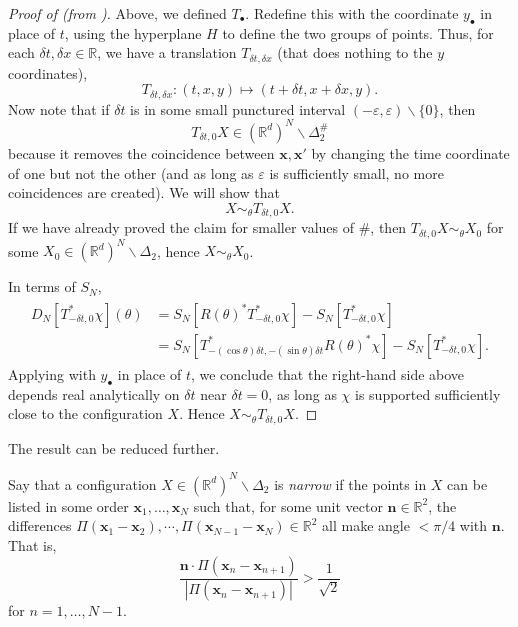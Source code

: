 \documentclass[11pt, letterpaper, reqno]{amsart}
\theoremstyle{definition}
\theoremstyle{remark}
\newcommand{\bbR}{\mathbb{R}}
\newcommand{\bfn}{\mathbf{n}}
\newcommand{\bfx}{\mathbf{x}}
\begin{document}
\begin{proof}[Proof of  (from )]
    
    Above, we defined $T_\bullet$. Redefine this with the coordinate $y_\bullet$ in place of $t$, using the hyperplane $H$ to define the two groups of points. Thus, for each $\delta t,\delta x\in \bbR$, we have a translation $T_{\delta t,\delta x}$ (that does nothing to the $y$ coordinates), 
    \begin{equation}
        T_{\delta t,\delta x}:(t,x,y)\mapsto (t+\delta t,x+\delta x,y).
    \end{equation}
    Now note that if $\delta t$ is in some small punctured interval $(-\varepsilon,\varepsilon)\backslash \{0\}$, then 
    \begin{equation}
        T_{\delta t,0} X  \in (\bbR^d)^N\backslash \Delta_2^\# 
    \end{equation}
    because it removes the coincidence between $\bfx,\bfx'$ by changing the time coordinate of one but not the other (and as long as $\varepsilon$ is sufficiently small, no more coincidences are created). We will show that 
    \begin{equation}
        X\sim_\theta T_{\delta t,0} X .
    \end{equation}
    If we have already proved the claim for smaller values of $\#$, then $T_{\delta t,0} X\sim_\theta X_0$ for some $X_0\in (\bbR^d)^N\backslash \Delta_2$, hence $X\sim_\theta X_0$. 

     In terms of $S_N$, 
    \begin{align}
    \begin{split} 
        D_N[T_{-\delta t,0}^* \chi ](\theta) &= S_N[R(\theta)^* T_{-\delta t,0}^* \chi] - S_N[T_{-\delta t,0}^* \chi] \\
        &= S_N[T_{-(\cos \theta )\delta t, -(\sin \theta)\delta t}^* R(\theta)^*  \chi] - S_N[T_{-\delta t,0}^* \chi].
        \end{split} 
    \end{align}
    Applying  with $y_\bullet$ in place of $t$, we conclude that the right-hand side above depends real analytically on $\delta t$ near $\delta t=0$, as long as $\chi$ is supported sufficiently close to the configuration $X$. Hence $X\sim_\theta T_{\delta t,0} X$.
\end{proof}

The result can be reduced further. 


Say that a configuration $X \in (\bbR^d)^N\backslash \Delta_2$ is \emph{narrow} if the points in $X$ can be listed in some order $\bfx_1,\dots,\bfx_N$ such that, for some unit vector $\bfn\in \bbR^2$, the differences $\Pi(\bfx_{1} - \bfx_{2}),\cdots , \Pi(\bfx_{N-1}-\bfx_N)\in \bbR^2$ all make angle $<\pi/4$ with $\bfn$. That is, 
\begin{equation}
    \frac{\bfn \cdot \Pi (\bfx_{n} - \bfx_{n+1} )}{|\Pi(\bfx_{n} - \bfx_{n+1})|} > \frac{1}{\sqrt{2}}
\end{equation}
for $n=1,\dots,N-1$. 
\end{document}
